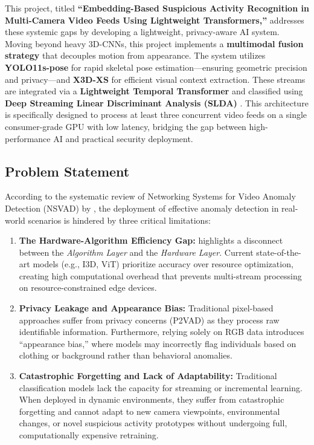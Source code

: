 \documentclass[12pt]{article}
\begin{document}
This project, titled \textbf{``Embedding-Based Suspicious Activity Recognition in Multi-Camera Video Feeds Using Lightweight Transformers,''} addresses these systemic gaps by developing a lightweight, privacy-aware AI system. Moving beyond heavy 3D-CNNs, this project implements a \textbf{multimodal fusion strategy} that decouples motion from appearance. The system utilizes \textbf{YOLO11s-pose} for rapid skeletal pose estimation—ensuring geometric precision and privacy—and \textbf{X3D-XS} for efficient visual context extraction. These streams are integrated via a \textbf{Lightweight Temporal Transformer} and classified using \textbf{Deep Streaming Linear Discriminant Analysis (SLDA)} \citep{hayes2020lifelong}. This architecture is specifically designed to process at least three concurrent video feeds on a single consumer-grade GPU with low latency, bridging the gap between high-performance AI and practical security deployment.

\subsection{Problem Statement}
According to the systematic review of Networking Systems for Video Anomaly Detection (NSVAD) by \cite{liu2024networking}, the deployment of effective anomaly detection in real-world scenarios is hindered by three critical limitations:

\begin{enumerate}
    \item \textbf{The Hardware-Algorithm Efficiency Gap:} \cite{liu2024networking} highlights a disconnect between the \textit{Algorithm Layer} and the \textit{Hardware Layer}. Current state-of-the-art models (e.g., I3D, ViT) prioritize accuracy over resource optimization, creating high computational overhead that prevents multi-stream processing on resource-constrained edge devices.
    
    \item \textbf{Privacy Leakage and Appearance Bias:} Traditional pixel-based approaches suffer from privacy concerns (P2VAD) as they process raw identifiable information. Furthermore, relying solely on RGB data introduces ``appearance bias,'' where models may incorrectly flag individuals based on clothing or background rather than behavioral anomalies.
    
    \item \textbf{Catastrophic Forgetting and Lack of Adaptability:} Traditional classification models lack the capacity for streaming or incremental learning. When deployed in dynamic environments, they suffer from catastrophic forgetting and cannot adapt to new camera viewpoints, environmental changes, or novel suspicious activity prototypes without undergoing full, computationally expensive retraining.
\end{enumerate}
\end{document}
